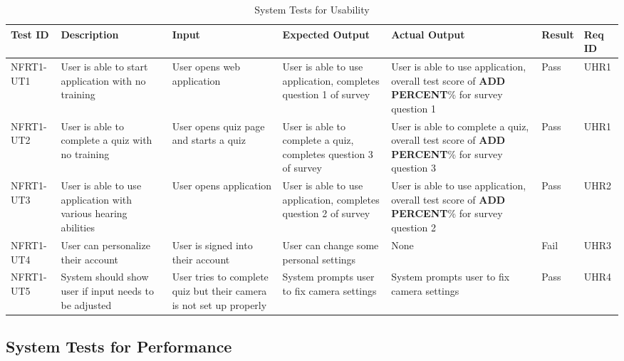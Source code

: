 \documentclass[12pt, titlepage]{article}
\begin{document}
\begin{longtable}{|p{1.5cm}|p{2.5cm}|p{2cm}|p{2cm}|p{2cm}|p{1.5cm}|p{1.5cm}|}
\caption{System Tests for Usability} \\
\hline
\textbf{Test ID} & \textbf{Description} & \textbf{Input} & \textbf{Expected Output} & \textbf{Actual Output} & \textbf{Result} & \textbf{Req ID}\\
\hline
NFRT1-UT1 & User is able to start application with no training & User opens web application & User is able to use application, completes question 1 of survey & User is able to use application, overall test score of \textbf{ADD PERCENT}\% for survey question 1 & Pass & UHR1 \\
\hline
NFRT1-UT2 & User is able to complete a quiz with no training & User opens quiz page and starts a quiz & User is able to complete a quiz, completes question 3 of survey & User is able to complete a quiz, overall test score of \textbf{ADD PERCENT}\% for survey question 3 & Pass & UHR1 \\
\hline
NFRT1-UT3 & User is able to use application with various hearing abilities & User opens application & User is able to use application, completes question 2 of survey & User is able to use application, overall test score of \textbf{ADD PERCENT}\% for survey question 2 & Pass & UHR2 \\
\hline
NFRT1-UT4 & User can personalize their account & User is signed into their account & User can change some personal settings & None & Fail & UHR3 \\
\hline
NFRT1-UT5 & System should show user if input needs to be adjusted & User tries to complete quiz but their camera is not set up properly & System prompts user to fix camera settings & System prompts user to fix camera settings & Pass & UHR4 \\
\bottomrule
\end{longtable}
		
\subsection{System Tests for Performance}
\end{document}
